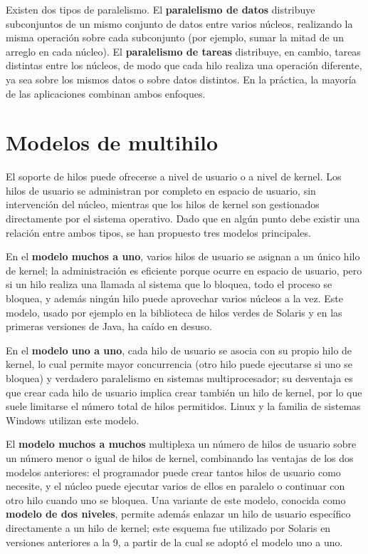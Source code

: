 \documentclass[12pt,letterpaper]{article}
\begin{document}
Existen dos tipos de paralelismo. El \textbf{paralelismo de datos} distribuye subconjuntos de un mismo conjunto de datos entre varios núcleos, realizando la misma operación sobre cada subconjunto (por ejemplo, sumar la mitad de un arreglo en cada núcleo). El \textbf{paralelismo de tareas} distribuye, en cambio, tareas distintas entre los núcleos, de modo que cada hilo realiza una operación diferente, ya sea sobre los mismos datos o sobre datos distintos. En la práctica, la mayoría de las aplicaciones combinan ambos enfoques.

\section{Modelos de multihilo}

El soporte de hilos puede ofrecerse a nivel de usuario o a nivel de kernel. Los hilos de usuario se administran por completo en espacio de usuario, sin intervención del núcleo, mientras que los hilos de kernel son gestionados directamente por el sistema operativo. Dado que en algún punto debe existir una relación entre ambos tipos, se han propuesto tres modelos principales.

En el \textbf{modelo muchos a uno}, varios hilos de usuario se asignan a un único hilo de kernel; la administración es eficiente porque ocurre en espacio de usuario, pero si un hilo realiza una llamada al sistema que lo bloquea, todo el proceso se bloquea, y además ningún hilo puede aprovechar varios núcleos a la vez. Este modelo, usado por ejemplo en la biblioteca de hilos verdes de Solaris y en las primeras versiones de Java, ha caído en desuso.

En el \textbf{modelo uno a uno}, cada hilo de usuario se asocia con su propio hilo de kernel, lo cual permite mayor concurrencia (otro hilo puede ejecutarse si uno se bloquea) y verdadero paralelismo en sistemas multiprocesador; su desventaja es que crear cada hilo de usuario implica crear también un hilo de kernel, por lo que suele limitarse el número total de hilos permitidos. Linux y la familia de sistemas Windows utilizan este modelo.

El \textbf{modelo muchos a muchos} multiplexa un número de hilos de usuario sobre un número menor o igual de hilos de kernel, combinando las ventajas de los dos modelos anteriores: el programador puede crear tantos hilos de usuario como necesite, y el núcleo puede ejecutar varios de ellos en paralelo o continuar con otro hilo cuando uno se bloquea. Una variante de este modelo, conocida como \textbf{modelo de dos niveles}, permite además enlazar un hilo de usuario específico directamente a un hilo de kernel; este esquema fue utilizado por Solaris en versiones anteriores a la 9, a partir de la cual se adoptó el modelo uno a uno.
\end{document}
